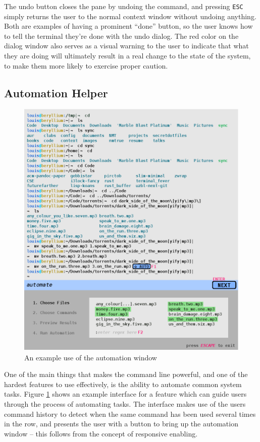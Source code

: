 The undo button closes the pane by undoing the command, and pressing
\texttt{ESC} simply returns the user to the normal context window without
undoing anything. Both are examples of having a prominent ``done'' button, so
the user knows how to tell the terminal they're done with the undo dialog. The
red color on the dialog window also serves as a visual warning to the user to
indicate that what they are doing will ultimately result in a real change to the
state of the system, to make them more likely to exercise proper caution.

\subsection{Automation Helper}

\begin{figure}[H]
  \centering
  \includegraphics[width=0.8\linewidth]{figures/interface/automation.eps}
  \caption{An example use of the automation window}
  \label{fig:autow}
\end{figure}

One of the main things that makes the command line powerful, and one of the
hardest features to use effectively, is the ability to automate common system
tasks. Figure \ref{fig:autow} shows an example interface for a feature which can
guide users through the process of automating tasks. The interface makes use of
the users command history to detect when the same command has been used several
times in the row, and presents the user with a button to bring up the automation
window \--- this follows from the concept of responsive enabling.

